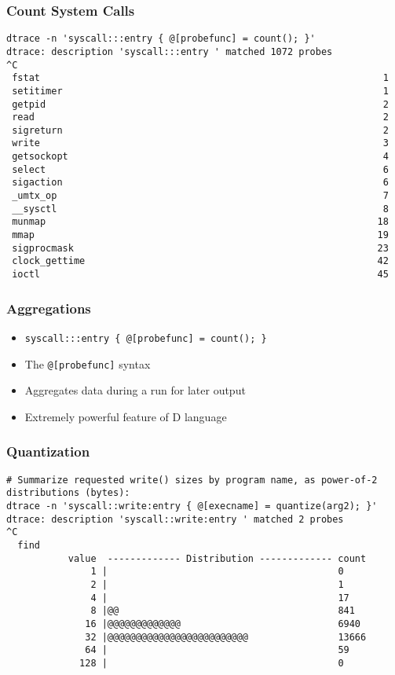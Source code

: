 \documentclass[pdftex]{beamer} %
\begin{document}
\begin{frame}[fragile]
  \frametitle{Count System Calls}
\begin{lstlisting}
dtrace -n 'syscall:::entry { @[probefunc] = count(); }'
dtrace: description 'syscall:::entry ' matched 1072 probes
^C
 fstat                                                             1
 setitimer                                                         1
 getpid                                                            2
 read                                                              2
 sigreturn                                                         2
 write                                                             3
 getsockopt                                                        4
 select                                                            6
 sigaction                                                         6
 _umtx_op                                                          7
 __sysctl                                                          8
 munmap                                                           18
 mmap                                                             19
 sigprocmask                                                      23
 clock_gettime                                                    42
 ioctl                                                            45
\end{lstlisting}
\end{frame}

\begin{frame}[fragile]
  \frametitle{Aggregations}
  \begin{itemize}
  \item \verb+syscall:::entry { @[probefunc] = count(); }+
  \item The \verb+@[probefunc]+ syntax
  \item Aggregates data during a run for later output
  \item Extremely powerful feature of D language
  \end{itemize}
\end{frame}

\begin{frame}[fragile]
  \frametitle{Quantization}
\begin{lstlisting}
# Summarize requested write() sizes by program name, as power-of-2 distributions (bytes):
dtrace -n 'syscall::write:entry { @[execname] = quantize(arg2); }'
dtrace: description 'syscall::write:entry ' matched 2 probes
^C
  find                                              
           value  ------------- Distribution ------------- count    
               1 |                                         0        
               2 |                                         1        
               4 |                                         17       
               8 |@@                                       841      
              16 |@@@@@@@@@@@@@                            6940     
              32 |@@@@@@@@@@@@@@@@@@@@@@@@@                13666    
              64 |                                         59       
             128 |                                         0        
\end{lstlisting}
\end{frame}
\end{document}
